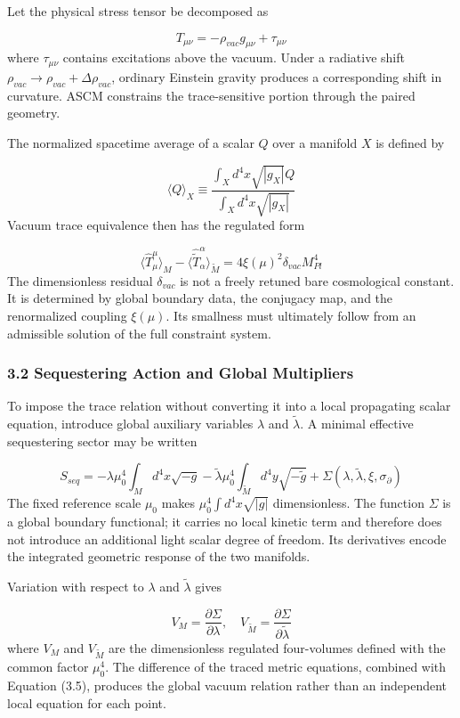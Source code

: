 \documentclass[aps,prd,onecolumn,superscriptaddress,nofootinbib,longbibliography,10pt]{revtex4-2}
\begin{document}
  Let the physical stress tensor be decomposed as


  \[ T_{\mu\nu} = -\rho_{vac} g_{\mu\nu} + \tau_{\mu\nu} \]
  where \(\tau_{\mu\nu}\) contains excitations above the vacuum. Under a radiative shift \(\rho_{vac} \to \rho_{vac} + \Delta\rho_{vac}\), ordinary Einstein gravity produces a corresponding shift in curvature. ASCM constrains the trace-sensitive portion through the paired geometry.


  The normalized spacetime average of a scalar \(Q\) over a manifold \(X\) is defined by


  \[ \langle Q \rangle_X \equiv \frac{\int_X d^4x \sqrt{|g_X|} Q}{\int_X d^4x \sqrt{|g_X|}} \]
  Vacuum trace equivalence then has the regulated form


  \[ \langle \hat{T}^\mu_\mu \rangle_M - \langle \hat{\tilde{T}}^\alpha_\alpha \rangle_{\tilde{M}} = 4\xi(\mu)^2 \delta_{vac} M_{Pl}^4 \]
  The dimensionless residual \(\delta_{vac}\) is not a freely retuned bare cosmological constant. It is determined by global boundary data, the conjugacy map, and the renormalized coupling \(\xi(\mu)\). Its smallness must ultimately follow from an admissible solution of the full constraint system.



  
\subsubsection*{3.2 Sequestering Action and Global Multipliers}

  To impose the trace relation without converting it into a local propagating scalar equation, introduce global auxiliary variables \(\lambda\) and \(\tilde{\lambda}\). A minimal effective sequestering sector may be written


  \[ S_{seq} = -\lambda \mu_0^4 \int_M d^4x \sqrt{-g} - \tilde{\lambda} \mu_0^4 \int_{\tilde{M}} d^4y \sqrt{-\tilde{g}} + \Sigma(\lambda, \tilde{\lambda}, \xi, \sigma_\partial) \]
  The fixed reference scale \(\mu_0\) makes \(\mu_0^4 \int d^4x \sqrt{|g|}\) dimensionless. The function \(\Sigma\) is a global boundary functional; it carries no local kinetic term and therefore does not introduce an additional light scalar degree of freedom. Its derivatives encode the integrated geometric response of the two manifolds.


  Variation with respect to \(\lambda\) and \(\tilde{\lambda}\) gives


  \[ V_M = \frac{\partial\Sigma}{\partial\lambda}, \quad V_{\tilde{M}} = \frac{\partial\Sigma}{\partial\tilde{\lambda}} \]
  where \(V_M\) and \(V_{\tilde{M}}\) are the dimensionless regulated four-volumes defined with the common factor \(\mu_0^4\). The difference of the traced metric equations, combined with Equation (3.5), produces the global vacuum relation rather than an independent local equation for each point.
\end{document}

